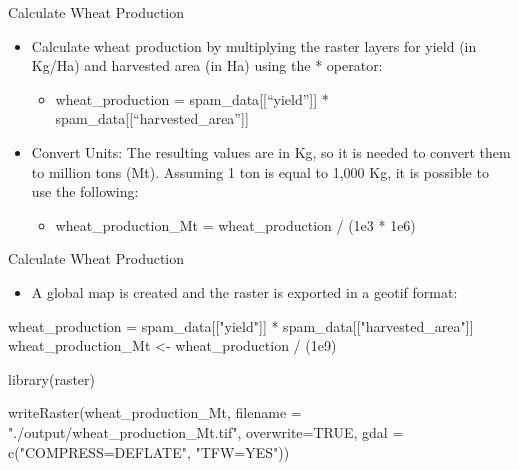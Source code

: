\documentclass[
  ignorenonframetext,
  aspectratio=169,
]{beamer}
\newenvironment{Shaded}{\begin{snugshade}}{\end{snugshade}}
\newcommand{\AttributeTok}[1]{\textcolor[rgb]{0.40,0.45,0.13}{#1}}
\newcommand{\ConstantTok}[1]{\textcolor[rgb]{0.56,0.35,0.01}{#1}}
\newcommand{\FloatTok}[1]{\textcolor[rgb]{0.68,0.00,0.00}{#1}}
\newcommand{\FunctionTok}[1]{\textcolor[rgb]{0.28,0.35,0.67}{#1}}
\newcommand{\NormalTok}[1]{\textcolor[rgb]{0.00,0.23,0.31}{#1}}
\newcommand{\OtherTok}[1]{\textcolor[rgb]{0.00,0.23,0.31}{#1}}
\newcommand{\SpecialCharTok}[1]{\textcolor[rgb]{0.37,0.37,0.37}{#1}}
\newcommand{\StringTok}[1]{\textcolor[rgb]{0.13,0.47,0.30}{#1}}
\providecommand{\tightlist}{%
  \setlength{\itemsep}{0pt}\setlength{\parskip}{0pt}}\usepackage{longtable,booktabs,array}
\begin{document}
\begin{frame}{Calculate Wheat Production}
\protect\hypertarget{calculate-wheat-production}{}
\begin{itemize}[<+->]
\item
  Calculate wheat production by multiplying the raster layers for yield
  (in Kg/Ha) and harvested area (in Ha) using the * operator:

  \begin{itemize}[<+->]
  \tightlist
  \item
    wheat\_production = spam\_data{[}{[}``yield''{]}{]} *
    spam\_data{[}{[}``harvested\_area''{]}{]}
  \end{itemize}
\item
  Convert Units: The resulting values are in Kg, so it is needed to
  convert them to million tons (Mt). Assuming 1 ton is equal to 1,000
  Kg, it is possible to use the following:

  \begin{itemize}[<+->]
  \tightlist
  \item
    wheat\_production\_Mt = wheat\_production / (1e3 * 1e6)
  \end{itemize}
\end{itemize}
\end{frame}

\begin{frame}[fragile]{Calculate Wheat Production}
\protect\hypertarget{calculate-wheat-production-1}{}
\begin{itemize}[<+->]
\tightlist
\item
  A global map is created and the raster is exported in a geotif format:
\end{itemize}

\linespread{0.5}

\begin{Shaded}
\begin{Highlighting}[]
\NormalTok{wheat\_production }\OtherTok{=}\NormalTok{ spam\_data[[}\StringTok{"yield"}\NormalTok{]] }\SpecialCharTok{*}\NormalTok{ spam\_data[[}\StringTok{"harvested\_area"}\NormalTok{]]}
\NormalTok{wheat\_production\_Mt }\OtherTok{\textless{}{-}}\NormalTok{ wheat\_production }\SpecialCharTok{/}\NormalTok{ (}\FloatTok{1e9}\NormalTok{)}
\end{Highlighting}
\end{Shaded}

\linespread{2}

\linespread{0.5}

\begin{Shaded}
\begin{Highlighting}[]
\FunctionTok{library}\NormalTok{(raster)}

\FunctionTok{writeRaster}\NormalTok{(wheat\_production\_Mt, }\AttributeTok{filename =} \StringTok{"./output/wheat\_production\_Mt.tif"}\NormalTok{, }
            \AttributeTok{overwrite=}\ConstantTok{TRUE}\NormalTok{, }\AttributeTok{gdal =} \FunctionTok{c}\NormalTok{(}\StringTok{"COMPRESS=DEFLATE"}\NormalTok{, }\StringTok{"TFW=YES"}\NormalTok{))}
\end{Highlighting}
\end{Shaded}

\linespread{2}
\end{frame}
\end{document}

